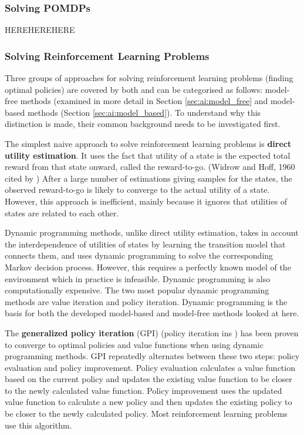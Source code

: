 \subsubsection{Solving POMDPs}


HEREHEREHERE


\subsubsection{Solving Reinforcement Learning Problems}

Three groups of approaches for solving reinforcement learning problems (finding
optimal policies) are covered by both \textcite{Russell210ai+modern} and
\textcite{Sutton1998ai+reinforcement} can be categorised as follows: model-
free methods (examined in more detail in Section \ref{sec:ai:model_free} and
model-based methods (Section \ref{sec:ai:model_based}). To understand why this
distinction is made, their common background needs to be investigated first.

The simplest naive approach to solve reinforcement learning problems is
\textbf{direct utility estimation}. It uses the fact that utility of a state is
the expected total reward from that state onward, called the reward-to-go.
(Widrow and Hoff, 1960 cited by \textcite{Russell2010ai+modern}) After a large
number of estimations giving samples for the states, the observed reward-to-go
is likely to converge to the actual utility of a state. However, this approach
is inefficient, mainly because it ignores that utilities of states are related
to each other. \parencite{Russell2010ai+modern}

Dynamic programming methods, unlike direct utility estimation, takes in
account the interdependence of utilities of states by learning the transition
model that connects them, and uses dynamic programming to solve the
corresponding Markov decision process. However, this requires a perfectly known
model of the environment which in practice is infeasible. Dynamic programming
is also computationally expensive. The two most popular dynamic programming
methods are value iteration and policy iteration. Dynamic programming is the
basis for both the developed model-based and model-free methods looked at here.
\parencite{Sutton1998ai+reinforcement}

The \textbf{generalized policy iteration} (GPI) (policy iteration ins
\textcite{Russell2010ai+modern}) has been proven to converge to optimal
policies and value functions when using dynamic programming methods. GPI
repeatedly alternates between these two steps: policy evaluation and policy
improvement. Policy evaluation calculates a value function based on the current
policy and updates the existing value function to be closer to the newly
calculated value function. Policy improvement uses the updated value function
to calculate a new policy and then updates the existing policy to be closer to
the newly calculated policy. Most reinforcement learning problems use this
algorithm. 


